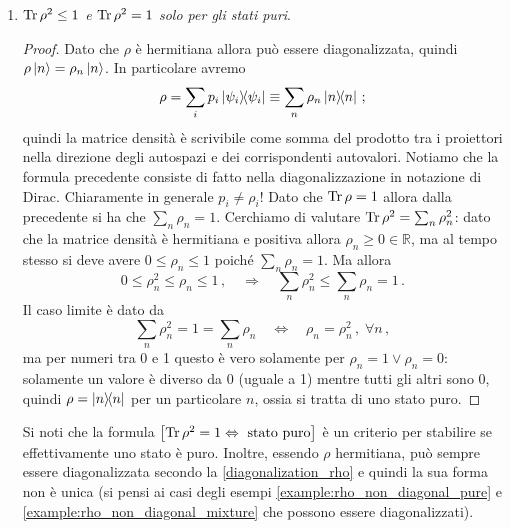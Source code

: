 \begin{enumerate}
    \item \textit{$\Tr \rho^2 \leq 1$ e $\Tr \rho^2 = 1$ solo per gli stati puri}.
    \begin{proof}
        Dato che $\rho$ è hermitiana allora può essere diagonalizzata, quindi $\rho \ket{n} = \rho_n \ket{n}$. In particolare avremo
        \begin{equation}\label{diagonalization_rho}
            \rho = \sum_i p_i \ketbra{\psi_i} \equiv \sum_n \rho_n \ketbra{n} \, ;
        \end{equation}
        quindi la matrice densità è scrivibile come somma del prodotto tra i proiettori nella direzione degli autospazi e dei corrispondenti autovalori. Notiamo che la formula precedente consiste di fatto nella diagonalizzazione in notazione di Dirac. Chiaramente in generale $p_i \neq \rho_i$! Dato che $\Tr \rho = 1$ allora dalla precedente si ha che $\sum_n \rho_n = 1$. Cerchiamo di valutare $\Tr \rho^2 = \sum_n \rho_n^2$: dato che la matrice densità è hermitiana e positiva allora $\rho_n \geq 0 \in \mathbb{R}$, ma al tempo stesso si deve avere $0 \leq \rho_n \leq 1$ poiché $\sum_n \rho_n = 1$. Ma allora
        \begin{equation*}
            0 \leq \rho_n^2 \leq \rho_n \leq 1 \, , \quad \Rightarrow \quad \sum_n \rho_n^2 \leq \sum_n \rho_n = 1 \, .
        \end{equation*}
        Il caso limite è dato da
        \begin{equation*}
            \sum_n \rho_n^2 = 1 = \sum_n \rho_n \quad \Leftrightarrow \quad \rho_n = \rho_n^2 \, , \; \forall n \, ,
        \end{equation*}
        ma per numeri tra 0 e 1 questo è vero solamente per $\rho_n = 1 \lor \rho_n = 0$: solamente un valore è diverso da 0 (uguale a 1) mentre tutti gli altri sono 0, quindi $\rho = \ketbra{n}$ per un particolare $n$, ossia si tratta di uno stato puro. 
    \end{proof}
    Si noti che la formula $\left[ \Tr \rho^2 = 1 \Leftrightarrow \text{ stato puro} \right]$ è un criterio per stabilire se effettivamente uno stato è puro. Inoltre, essendo $\rho$ hermitiana, può sempre essere diagonalizzata secondo la \eqref{diagonalization_rho} e quindi la sua forma non è unica (si pensi ai casi degli esempi \ref{example:rho_non_diagonal_pure} e \ref{example:rho_non_diagonal_mixture} che possono essere diagonalizzati).
\end{enumerate}


